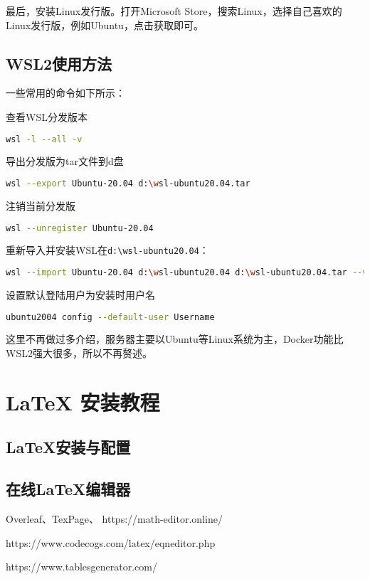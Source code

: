 \documentclass[lang=cn,a4paper,newtx]{elegantpaper}
\begin{document}
最后，安装Linux发行版。打开Microsoft Store，搜索Linux，选择自己喜欢的Linux发行版，例如Ubuntu，点击获取即可。

\subsection{WSL2使用方法}
一些常用的命令如下所示：

查看WSL分发版本
\begin{lstlisting}[language=bash]
  wsl -l --all -v
\end{lstlisting}

导出分发版为tar文件到d盘
\begin{lstlisting}[language=bash]
  wsl --export Ubuntu-20.04 d:\wsl-ubuntu20.04.tar
\end{lstlisting}

注销当前分发版
\begin{lstlisting}[language=bash]
  wsl --unregister Ubuntu-20.04
\end{lstlisting}

重新导入并安装WSL在\verb|d:\wsl-ubuntu20.04|：
\begin{lstlisting}[language=bash]
  wsl --import Ubuntu-20.04 d:\wsl-ubuntu20.04 d:\wsl-ubuntu20.04.tar --version 2
\end{lstlisting}

设置默认登陆用户为安装时用户名
\begin{lstlisting}[language=bash]
  ubuntu2004 config --default-user Username
\end{lstlisting}

这里不再做过多介绍，服务器主要以Ubuntu等Linux系统为主，Docker功能比WSL2强大很多，所以不再赘述。
\section{LaTeX 安装教程}
\subsection{LaTeX安装与配置}
\subsection{在线LaTeX编辑器}
Overleaf、TexPage、
https://math-editor.online/

https://www.codecogs.com/latex/eqneditor.php

https://www.tablesgenerator.com/
\end{document}
